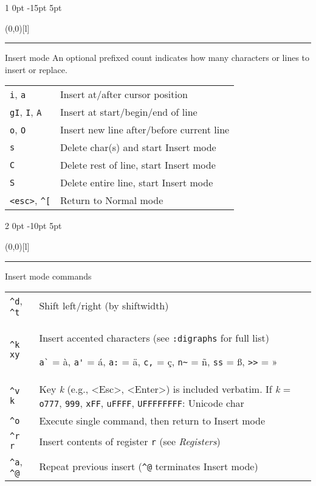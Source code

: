 \documentclass[a4paper, landscape, 10pt]{article}
\makeatletter
\newlength{\shift}
\renewcommand{\section}{%
    \@startsection{section}%
        {1}%
        {0pt}%
        {-15pt}%
        {5pt}%
        {\protect\makebox(0,0)[l]{\color{accentcolor!80}\rule[8pt]{\columnwidth}{19pt}}\hspace{.5em}\fontsize{14pt}{12pt}\fontseries{ub}\selectfont\color{white}}}
\renewcommand{\subsection}{%
    \@startsection{subsection}%
        {2}%
        {0pt}%
        {-10pt}%
        {5pt}%
        {\protect\makebox(0,0)[l]{\color{accentcolor!20}\rule[7pt]{\columnwidth}{19pt}}\hspace{.5em}\fontsize{12pt}{12pt}\selectfont\bfseries\itshape\color{accentcolor}}}
\newcommand{\V}[1]{\texttt{\textup{#1}}}
\makeatother
\begin{document}
\begin{multicols*}{3}
\section{Insert mode}
An optional prefixed count indicates how many characters or lines to insert or replace.
\vspace{.25\baselineskip}

    \begin{tabularx}{\columnwidth}{l>{\raggedright\arraybackslash}X}
\V{i}, \V{a}
        &Insert at/after cursor position\\
\V{gI}, \V{I}, \V{A}
        &Insert at start/begin/end of line\\
\V{o}, \V{O}
        &Insert new line after/before current line\\
\V{s}
        &Delete char(s) and start Insert mode\\
\V{C}
        &Delete rest of line, start Insert mode\\
\V{S}
        &Delete entire line, start Insert mode\\
\V{<esc>}, \verb|^[|
        &Return to Normal mode
    \end{tabularx}

\subsection{Insert mode commands}
    \begin{tabularx}{\columnwidth}{l>{\raggedright\arraybackslash}X}
\verb|^d|, \verb|^t|
        &Shift left/right (by shiftwidth)\\
\verb|^k xy|
        &Insert accented characters (see \V{:digraphs} for full list)

        \verb|a`| = à, \verb|a'| = á, \verb|a:| = ä, \verb|c,| = ç, \verb|n~| = ñ, \verb|ss| = ß, \V{>{}>} = »\\
\verb|^v k|
        &Key \textit{k} (e.g., <Esc>, <Enter>) is included verbatim.\linebreak
        If \textit{k} = \V{o777}, \V{999}, \V{xFF}, \V{uFFFF}, \V{UFFFFFFFF}: Unicode char\\
\verb|^o|
        &Execute single command, then return to Insert mode\\
\verb|^r r|
        &Insert contents of register \verb|r| (see \emph{Registers})\\
\verb|^a|, \verb|^@|
        &Repeat previous insert (\verb|^@| terminates Insert mode)
    \end{tabularx}




\end{multicols*}
\end{document}
